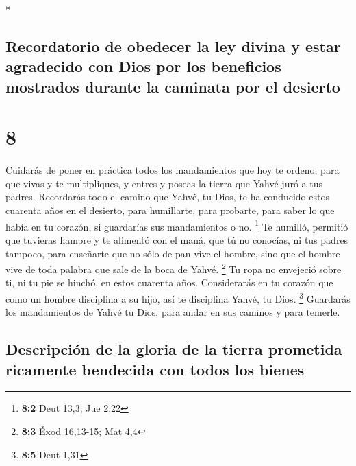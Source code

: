\begin{paracol}{2}
\begin{otherlanguage}{english}
\end{otherlanguage}

\switchcolumn[0]*

\hypertarget{recordatorio-de-obedecer-la-ley-divina-y-estar-agradecido-con-dios-por-los-beneficios-mostrados-durante-la-caminata-por-el-desierto}{%
\subsection{Recordatorio de obedecer la ley divina y estar agradecido
con Dios por los beneficios mostrados durante la caminata por el
desierto}\label{recordatorio-de-obedecer-la-ley-divina-y-estar-agradecido-con-dios-por-los-beneficios-mostrados-durante-la-caminata-por-el-desierto}}

\hypertarget{section-14}{%
\section{8}\label{section-14}}

 Cuidarás de poner en práctica todos los mandamientos que
hoy te ordeno, para que vivas y te multipliques, y entres y poseas la
tierra que Yahvé juró a tus padres.  Recordarás todo el
camino que Yahvé, tu Dios, te ha conducido estos cuarenta años en el
desierto, para humillarte, para probarte, para saber lo que había en tu
corazón, si guardarías sus mandamientos o no. \footnote{\textbf{8:2}
  Deut 13,3; Jue 2,22}  Te humilló, permitió que tuvieras
hambre y te alimentó con el maná, que tú no conocías, ni tus padres
tampoco, para enseñarte que no sólo de pan vive el hombre, sino que el
hombre vive de toda palabra que sale de la boca de Yahvé. \footnote{\textbf{8:3}
  Éxod 16,13-15; Mat 4,4}  Tu ropa no envejeció sobre ti,
ni tu pie se hinchó, en estos cuarenta años.  Considerarás
en tu corazón que como un hombre disciplina a su hijo, así te disciplina
Yahvé, tu Dios. \footnote{\textbf{8:5} Deut 1,31} 
Guardarás los mandamientos de Yahvé tu Dios, para andar en sus caminos y
para temerle.

\hypertarget{descripciuxf3n-de-la-gloria-de-la-tierra-prometida-ricamente-bendecida-con-todos-los-bienes}{%
\subsection{Descripción de la gloria de la tierra prometida ricamente
bendecida con todos los
bienes}\label{descripciuxf3n-de-la-gloria-de-la-tierra-prometida-ricamente-bendecida-con-todos-los-bienes}}


\end{paracol}
